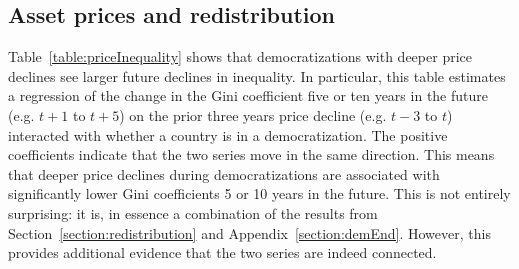 

\subsection{Asset prices and redistribution}\label{section:assRedistribution}

Table~\ref{table:priceInequality} shows that democratizations with deeper price declines see larger future declines in inequality. In particular, this table estimates a regression of the change in the Gini coefficient five or ten years in the future (e.g. $t+1$ to $t+5$) on the prior three years price decline (e.g. $t-3$ to $t$) interacted with whether a country is in a democratization. The positive coefficients indicate that the two series move in the same direction. This means that deeper price declines during democratizations are associated with significantly lower Gini coefficients 5 or 10 years in the future. This is not entirely surprising: it is, in essence a combination of the results from Section~\ref{section:redistribution} and Appendix~\ref{section:demEnd}. However, this provides additional evidence that the two series are indeed connected.

